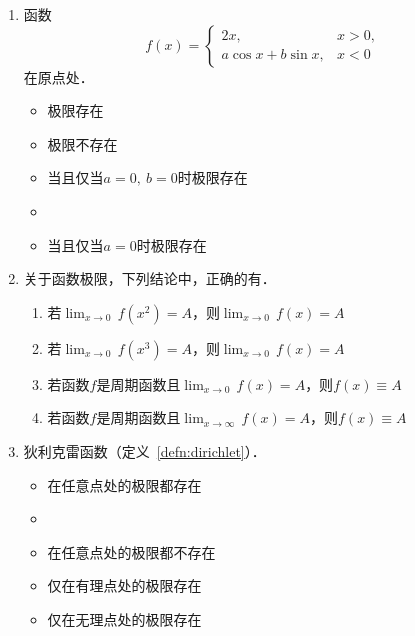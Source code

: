 \begin{enumerate}
\item 函数
  \begin{equation*}
    f(x) =
    \begin{cases}
      2x, & x > 0, \\
      a \cos x + b \sin x, & x < 0
    \end{cases}
  \end{equation*}
  在原点处\uline{\makebox[6em]{}}．
  \begin{itemize}
    \renewcommand{\labelitemi}{\faCircleThin}
  \item 极限存在
  \item 极限不存在
  \item 当且仅当\(a = 0,\ b = 0\)时极限存在
    \ifshowsol
    \item[\faCircle]
    \else
    \item
    \fi
    当且仅当\(a = 0\)时极限存在
  \end{itemize}

\item 关于函数极限，下列结论中，正确的有\uline{}．
  \begin{enumerate}
    \renewcommand{\labelenumii}{\enumparen{\arabic{enumii}}}
  \item 若\(\lim_{x\to0} \,f(x^2) = A\)，则\(\lim_{x\to0} \,f(x) = A\)
  \item 若\(\lim_{x\to0} \,f(x^3) = A\)，则\(\lim_{x\to0} \,f(x) = A\)
  \item 若函数\(f\)是周期函数且\(\lim_{x\to0} \,f(x) = A\)，则\(f(x) \equiv A\)
  \item 若函数\(f\)是周期函数且\(\lim_{x\to\infty} \,f(x) = A\)，则\(f(x) \equiv A\)
  \end{enumerate}

\item 狄利克雷函数（定义~\ref{defn:dirichlet}）\uline{\makebox[6em]{}}．
  \begin{itemize}
    \renewcommand{\labelitemi}{\faCircleThin}
  \item 在任意点处的极限都存在
    \ifshowsol
    \item[\faCircle]
    \else
    \item
    \fi
    在任意点处的极限都不存在
  \item 仅在有理点处的极限存在
  \item 仅在无理点处的极限存在
  \end{itemize}


\end{enumerate}
